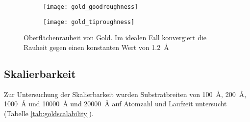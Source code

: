 \begin{figure}[bth]
  \captionsetup[subfigure]{singlelinecheck=false}
  \def\subfigwidth{0.49\textwidth}

  \begin{subfigure}[t]{\subfigwidth}
    \texttt{[image: gold\_goodroughness]}
    \label{fig:goldroughness-a}
  \end{subfigure}
  \hfill
  \begin{subfigure}[t]{\subfigwidth}
    \texttt{[image: gold\_tiproughness]}
    \label{fig:goldroughness-b}
  \end{subfigure}

  \caption[Oberflächenrauheit von Gold]{Oberflächenrauheit von Gold.
    Im idealen Fall konvergiert die Rauheit gegen einen konstanten Wert von \SI{1.2}{\angstrom}
  }
  \label{fig:goldroughness}

\end{figure}

\subsection{Skalierbarkeit}

Zur Untersuchung der Skalierbarkeit wurden Substratbreiten von \SI{100}{\angstrom}, \SI{200}{\angstrom}, \SI{1000}{\angstrom} und \SI{10000}{\angstrom} und \SI{20000}{\angstrom} auf Atomzahl und Laufzeit untersucht (Tabelle \ref{tab:goldscalability}).


